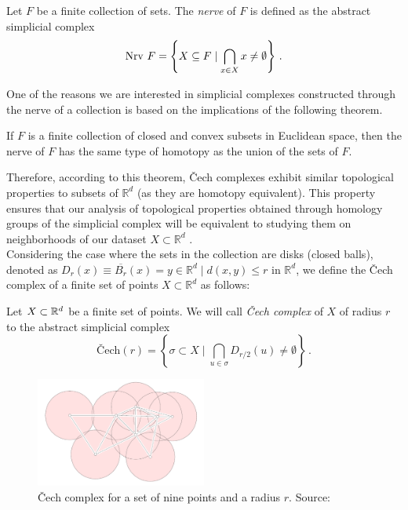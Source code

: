 \documentclass[../main.tex]{subfiles}
\begin{document}
\begin{definition}
Let $F$ be a finite collection of sets. The \emph{nerve} of $F$ is defined as the abstract simplicial complex
\[
{\rm Nrv}\ F= \left\{ X \subseteq F \mid \bigcap_{x\in X} x \neq \emptyset \right\}\,.
\]
\end{definition}

One of the reasons we are interested in simplicial complexes constructed through the nerve of a collection is based on the implications of the following theorem.

\begin{theorem}
If $F$ is a finite collection of closed and convex subsets in Euclidean space, then the nerve of $F$ has the same type of homotopy as the union of the sets of $F$.
\end{theorem}
Therefore, according to this theorem, \v{C}ech complexes exhibit similar topological properties to subsets of $\mathbb{R}^d$ (as they are homotopy equivalent). This property ensures that our analysis of topological properties obtained through homology groups of the simplicial complex will be equivalent to studying them on neighborhoods of our dataset $X \subset \mathbb{R}^d$ \cite{doherty_cech_2018}.\\

Considering the case where the sets in the collection are disks (closed balls), denoted as $D_r(x) \equiv \overline{B_r}(x) = {y\in \mathbb{R}^d \mid d(x, y) \leq r}$ in $\mathbb{R}^d$, we define the \v{C}ech complex of a finite set of points $X \subset \mathbb{R}^d$ as follows:

\begin{definition}
Let $X\subset \mathbb{R}^d$ be a finite set of points. We will call \emph{\v{C}ech complex} of $X$ of radius $r$ to the abstract simplicial complex
\[
\text{\v{C}ech}(r)=\left\{\sigma \subset X \mid \bigcap_{u \in \sigma} D_{r/2}(u)\neq \emptyset \right\}\,.
\]
\end{definition}

\begin{figure}[!ht]
\centering
\includegraphics[width=0.5\textwidth]{figures/bg/Cech.png} 
\caption{\v{C}ech complex for a set of nine points and a radius $r$. Source: \cite{edelsbrunner_computational_2010}}
\label{fig:cech}
\end{figure}
\end{document}
